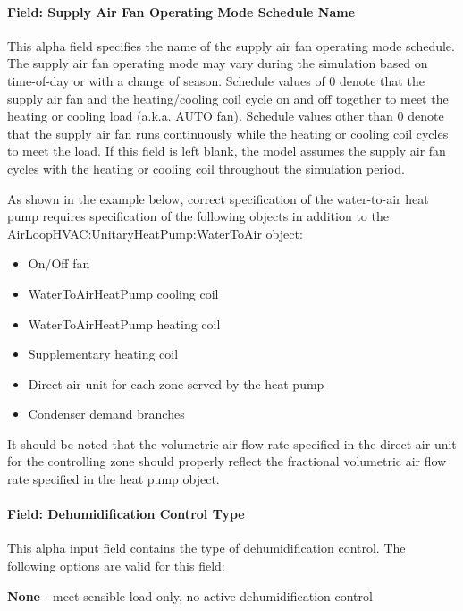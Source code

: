 \paragraph{Field: Supply Air Fan Operating Mode Schedule Name}\label{field-supply-air-fan-operating-mode-schedule-name-2}

This alpha field specifies the name of the supply air fan operating mode schedule. The supply air fan operating mode may vary during the simulation based on time-of-day or with a change of season. Schedule values of 0 denote that the supply air fan and the heating/cooling coil cycle on and off together to meet the heating or cooling load (a.k.a. AUTO fan). Schedule values other than 0 denote that the supply air fan runs continuously while the heating or cooling coil cycles to meet the load. If this field is left blank, the model assumes the supply air fan cycles with the heating or cooling coil throughout the simulation period.

As shown in the example below, correct specification of the water-to-air heat pump requires specification of the following objects in addition to the AirLoopHVAC:UnitaryHeatPump:WaterToAir object:

\begin{itemize}
\item
  On/Off fan
\item
  WaterToAirHeatPump cooling coil
\item
  WaterToAirHeatPump heating coil
\item
  Supplementary heating coil
\item
  Direct air unit for each zone served by the heat pump
\item
  Condenser demand branches
\end{itemize}

It should be noted that the volumetric air flow rate specified in the direct air unit for the controlling zone should properly reflect the fractional volumetric air flow rate specified in the heat pump object.

\paragraph{Field: Dehumidification Control Type}\label{field-dehumidification-control-type-4-000}

This alpha input field contains the type of dehumidification control. The following options are valid for this field:

\textbf{None} - meet sensible load only, no active dehumidification control

